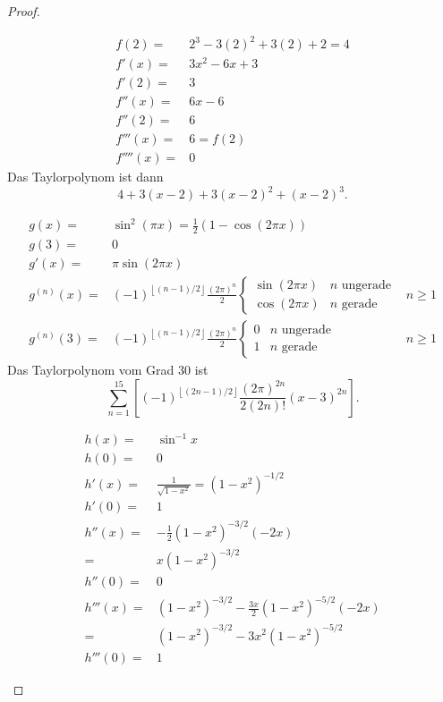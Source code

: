 \begin{proof}
	\begin{parts}
	\item 
		{\allowdisplaybreaks
		\begin{align*}
			f(2)=&2^3-3(2)^2+3(2)+2=4\\
			f'(x)=&3x^2-6x+3\\
			f'(2)=&3\\
			f''(x)=&6x-6\\
			f''(2)=&6\\
			f'''(x)=&6=f(2)\\
			f''''(x)=&0
		\end{align*}
	}
		Das Taylorpolynom ist dann
		\[
		4+3(x-2)+3(x-2)^2+(x-2)^3
		.\] 
	\item {\allowdisplaybreaks
		\begin{align*}
			g(x)=&\sin^2(\pi x)=\frac{1}{2}\left( 1-\cos(2\pi x) \right) \\
			g(3)=&0\\
			g'(x)=&\pi \sin(2\pi x)\\
			g^{(n)}(x)=&\left( -1 \right)^{\left\lfloor (n-1) / 2 \right\rfloor}\frac{(2\pi)^{n}}{2}\begin{cases}
				\sin(2\pi x) & n\text{ ungerade}\\
				\cos(2\pi x) & n\text{ gerade}
			\end{cases} & n\geq 1\\
				g^{(n)}(3)=& \left( -1 \right) ^{\left\lfloor (n - 1) / 2 \right\rfloor}\frac{(2\pi)^n}{2}\begin{cases}
					0 & n\text{ ungerade}\\
					1 & n\text{ gerade}	
				\end{cases} & n \ge 1
		\end{align*}
	}
		Das Taylorpolynom vom Grad 30 ist
		\[
			\sum_{n=1}^{15}\left[ \left( -1 \right) ^{\left\lfloor (2n -1) / 2 \right\rfloor}\frac{(2\pi)^{2n}}{2(2n)!}(x-3)^{2n}\right]
		.\] 
	\item
		{\allowdisplaybreaks
		\begin{align*}
			h(x)=& \sin^{-1}x\\
			h(0)=&0\\
			h'(x)=&\frac{1}{\sqrt{1-x^2} }=(1-x^2)^{-1 / 2}\\
			h'(0)=&1\\
			h''(x)=&-\frac{1}{2}\left( 1-x^2 \right)^{-3 / 2}(-2x)\\
			=& x(1-x^2)^{-3 / 2}\\
			h''(0) =& 0\\
			h'''(x)=&(1-x^2)^{-3 / 2}-\frac{3x}{2}\left( 1-x^2 \right) ^{- 5 / 2}(-2x)\\
=&(1-x^2)^{-3 / 2}-3x^2\left( 1-x^2 \right) ^{- 5 / 2}\\
h'''(0)=&1
		\end{align*}
	}
	\end{parts}
\end{proof}

